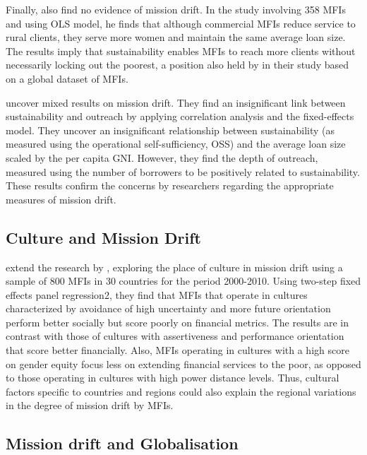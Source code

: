 \documentclass[a4paper,nobind]{templates/ociamthesis}
\begin{document}
Finally, \textcite{roberts2013profit} also find no evidence of mission drift. In the study involving 358 MFIs and using OLS model, he finds that although commercial MFIs reduce service to rural clients, they serve more women and maintain the same average loan size. The results imply that sustainability enables MFIs to reach more clients without necessarily locking out the poorest, a position also held by \textcite{nurmakhanova2015trade} in their study based on a global dataset of MFIs.

\textcite{abdulai2017trade} uncover mixed results on mission drift. They find an insignificant link between sustainability and outreach by applying correlation analysis and the fixed-effects model. They uncover an insignificant relationship between sustainability (as measured using the operational self-sufficiency, OSS) and the average loan size scaled by the per capita GNI. However, they find the depth of outreach, measured using the number of borrowers to be positively related to sustainability. These results confirm the concerns by researchers regarding the appropriate measures of mission drift.

\hypertarget{culture-and-mission-drift}{%
\subsection{Culture and Mission Drift}\label{culture-and-mission-drift}}

\noindent \textcite{manos2014determinants} extend the research by \textcite{abdulai2017trade}, exploring the place of culture in mission drift using a sample of 800 MFIs in 30 countries for the period 2000-2010. Using two-step fixed effects panel regression2, they find that MFIs that operate in cultures characterized by avoidance of high uncertainty and more future orientation perform better socially but score poorly on financial metrics. The results are in contrast with those of cultures with assertiveness and performance orientation that score better financially. Also, MFIs operating in cultures with a high score on gender equity focus less on extending financial services to the poor, as opposed to those operating in cultures with high power distance levels. Thus, cultural factors specific to countries and regions could also explain the regional variations in the degree of mission drift by MFIs.

\hypertarget{mission-drift-and-globalisation}{%
\subsection{Mission drift and Globalisation}\label{mission-drift-and-globalisation}}
\end{document}
